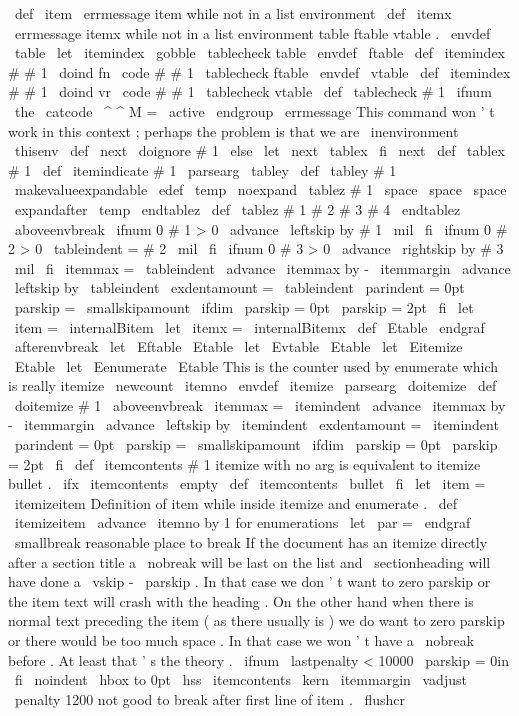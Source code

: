 \
def
\
item
{
\
errmessage
{
item
while
not
in
a
list
environment
}
}
\
def
\
itemx
{
\
errmessage
{
itemx
while
not
in
a
list
environment
}
}
%
table
ftable
vtable
.
\
envdef
\
table
{
%
\
let
\
itemindex
\
gobble
\
tablecheck
{
table
}
%
}
\
envdef
\
ftable
{
%
\
def
\
itemindex
#
#
1
{
\
doind
{
fn
}
{
\
code
{
#
#
1
}
}
}
%
\
tablecheck
{
ftable
}
%
}
\
envdef
\
vtable
{
%
\
def
\
itemindex
#
#
1
{
\
doind
{
vr
}
{
\
code
{
#
#
1
}
}
}
%
\
tablecheck
{
vtable
}
%
}
\
def
\
tablecheck
#
1
{
%
\
ifnum
\
the
\
catcode
\
^
^
M
=
\
active
\
endgroup
\
errmessage
{
This
command
won
'
t
work
in
this
context
;
perhaps
the
problem
is
that
we
are
\
inenvironment
\
thisenv
}
%
\
def
\
next
{
\
doignore
{
#
1
}
}
%
\
else
\
let
\
next
\
tablex
\
fi
\
next
}
\
def
\
tablex
#
1
{
%
\
def
\
itemindicate
{
#
1
}
%
\
parsearg
\
tabley
}
\
def
\
tabley
#
1
{
%
{
%
\
makevalueexpandable
\
edef
\
temp
{
\
noexpand
\
tablez
#
1
\
space
\
space
\
space
}
%
\
expandafter
}
\
temp
\
endtablez
}
\
def
\
tablez
#
1
#
2
#
3
#
4
\
endtablez
{
%
\
aboveenvbreak
\
ifnum
0
#
1
>
0
\
advance
\
leftskip
by
#
1
\
mil
\
fi
\
ifnum
0
#
2
>
0
\
tableindent
=
#
2
\
mil
\
fi
\
ifnum
0
#
3
>
0
\
advance
\
rightskip
by
#
3
\
mil
\
fi
\
itemmax
=
\
tableindent
\
advance
\
itemmax
by
-
\
itemmargin
\
advance
\
leftskip
by
\
tableindent
\
exdentamount
=
\
tableindent
\
parindent
=
0pt
\
parskip
=
\
smallskipamount
\
ifdim
\
parskip
=
0pt
\
parskip
=
2pt
\
fi
\
let
\
item
=
\
internalBitem
\
let
\
itemx
=
\
internalBitemx
}
\
def
\
Etable
{
\
endgraf
\
afterenvbreak
}
\
let
\
Eftable
\
Etable
\
let
\
Evtable
\
Etable
\
let
\
Eitemize
\
Etable
\
let
\
Eenumerate
\
Etable
%
This
is
the
counter
used
by
enumerate
which
is
really
itemize
\
newcount
\
itemno
\
envdef
\
itemize
{
\
parsearg
\
doitemize
}
\
def
\
doitemize
#
1
{
%
\
aboveenvbreak
\
itemmax
=
\
itemindent
\
advance
\
itemmax
by
-
\
itemmargin
\
advance
\
leftskip
by
\
itemindent
\
exdentamount
=
\
itemindent
\
parindent
=
0pt
\
parskip
=
\
smallskipamount
\
ifdim
\
parskip
=
0pt
\
parskip
=
2pt
\
fi
\
def
\
itemcontents
{
#
1
}
%
%
itemize
with
no
arg
is
equivalent
to
itemize
bullet
.
\
ifx
\
itemcontents
\
empty
\
def
\
itemcontents
{
\
bullet
}
\
fi
\
let
\
item
=
\
itemizeitem
}
%
Definition
of
item
while
inside
itemize
and
enumerate
.
%
\
def
\
itemizeitem
{
%
\
advance
\
itemno
by
1
%
for
enumerations
{
\
let
\
par
=
\
endgraf
\
smallbreak
}
%
reasonable
place
to
break
{
%
%
If
the
document
has
an
itemize
directly
after
a
section
title
a
%
\
nobreak
will
be
last
on
the
list
and
\
sectionheading
will
have
%
done
a
\
vskip
-
\
parskip
.
In
that
case
we
don
'
t
want
to
zero
%
parskip
or
the
item
text
will
crash
with
the
heading
.
On
the
%
other
hand
when
there
is
normal
text
preceding
the
item
(
as
there
%
usually
is
)
we
do
want
to
zero
parskip
or
there
would
be
too
much
%
space
.
In
that
case
we
won
'
t
have
a
\
nobreak
before
.
At
least
%
that
'
s
the
theory
.
\
ifnum
\
lastpenalty
<
10000
\
parskip
=
0in
\
fi
\
noindent
\
hbox
to
0pt
{
\
hss
\
itemcontents
\
kern
\
itemmargin
}
%
\
vadjust
{
\
penalty
1200
}
}
%
not
good
to
break
after
first
line
of
item
.
\
flushcr
}
